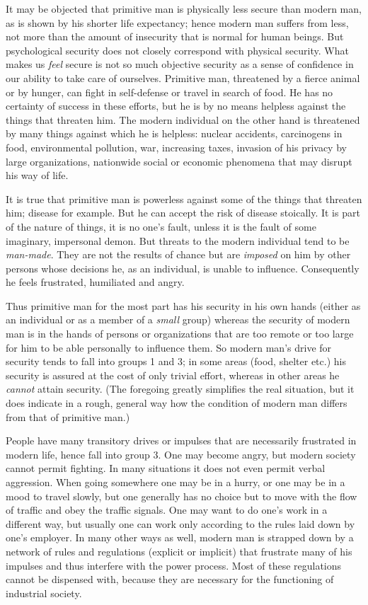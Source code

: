  It may be objected that primitive man is physically less secure than modern man, as is shown by his shorter life expectancy; hence modern man suffers from less, not more than the amount of insecurity that is normal for human beings. But psychological security does not closely correspond with physical security. What makes us {\em feel} secure is not so much objective security as a sense of confidence in our ability to take care of ourselves. Primitive man, threatened by a fierce animal or by hunger, can fight in self-defense or travel in search of food. He has no certainty of success in these efforts, but he is by no means helpless against the things that threaten him. The modern individual on the other hand is threatened by many things against which he is helpless: nuclear accidents, carcinogens in food, environmental pollution, war, increasing taxes, invasion of his privacy by large organizations, nationwide social or economic phenomena that may disrupt his way of life.

 It is true that primitive man is powerless against some of the things that threaten him; disease for example. But he can accept the risk of disease stoically. It is part of the nature of things, it is no one’s fault, unless it is the fault of some imaginary, impersonal demon. But threats to the modern individual tend to be {\em man-made}. They are not the results of chance but are {\em imposed} on him by other persons whose decisions he, as an individual, is unable to influence. Consequently he feels frustrated, humiliated and angry.

 Thus primitive man for the most part has his security in his own hands (either as an individual or as a member of a {\em small} group) whereas the security of modern man is in the hands of persons or organizations that are too remote or too large for him to be able personally to influence them. So modern man’s drive for security tends to fall into groups 1 and 3; in some areas (food, shelter etc.) his security is assured at the cost of only trivial effort, whereas in other areas he {\em cannot} attain security. (The foregoing greatly simplifies the real situation, but it does indicate in a rough, general way how the condition of modern man differs from that of primitive man.)

 People have many transitory drives or impulses that are necessarily frustrated in modern life, hence fall into group 3. One may become angry, but modern society cannot permit fighting. In many situations it does not even permit verbal aggression. When going somewhere one may be in a hurry, or one may be in a mood to travel slowly, but one generally has no choice but to move with the flow of traffic and obey the traffic signals. One may want to do one’s work in a different way, but usually one can work only according to the rules laid down by one’s employer. In many other ways as well, modern man is strapped down by a network of rules and regulations (explicit or implicit) that frustrate many of his impulses and thus interfere with the power process. Most of these regulations cannot be dispensed with, because they are necessary for the functioning of industrial society.


